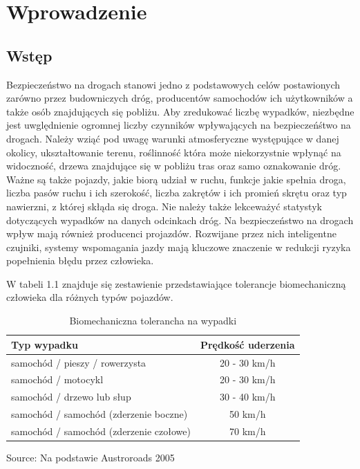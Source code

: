 \chapter{Wprowadzenie}
\label{cha:wprowadzenie}


\section{Wstęp}
\label{sec:wstep}

Bezpieczeństwo na drogach stanowi jedno z podstawowych celów postawionych zarówno przez budowniczych dróg, producentów samochodów ich użytkowników a także osób znajdujących się pobliżu. Aby zredukować liczbę wypadków, niezbędne jest uwględnienie ogromnej liczby czynników wpływających na bezpieczeńśtwo na drogach. Należy wziąć pod uwagę warunki atmosferyczne występujące w danej okolicy, ukształtowanie terenu, roślinność która może niekorzystnie wpłynąć na widoczność, drzewa znajdujące się w pobliżu tras oraz samo oznakowanie dróg. Ważne są także pojazdy, jakie biorą udział w ruchu, funkcje jakie spełnia droga, liczba pasów ruchu i ich szerokość, liczba zakrętów i ich promień skrętu oraz typ nawierzni, z której skłąda się droga. Nie należy także lekceważyć statystyk dotyczących wypadków na danych odcinkach dróg. Na bezpieczeństwo na drogach wpływ mają również producenci projazdów. Rozwijane przez nich inteligentne czujniki, systemy wspomagania jazdy mają kluczowe znaczenie w redukcji ryzyka popełnienia błędu przez człowieka.

W tabeli 1.1 znajduje się zestawienie przedstawiające tolerancje biomechaniczną człowieka dla różnych typów pojazdów.

\newcommand{\source}[1]{\caption*{Source: {#1}} }

\begin{table}[ht]
\centering
\caption{Biomechaniczna tolerancha na wypadki}
\label{my-label}
\begin{tabular}{| l | c |}
\hline
\textbf{Typ wypadku}                    & \textbf{Prędkość uderzenia} \\ \hline
samochód / pieszy / rowerzysta          & 20 - 30 km/h                                    \\ \hline
samochód / motocykl                     & 20 - 30 km/h                                    \\ \hline
samochód / drzewo lub słup              & 30 - 40 km/h                                    \\ \hline
samochód / samochód (zderzenie boczne)  & 50 km/h                                         \\ \hline
samochód / samochód (zderzenie czołowe) & 70 km/h   \\ \hline
\end{tabular}
\source{Na podstawie Austroroads 2005}
\end{table}

